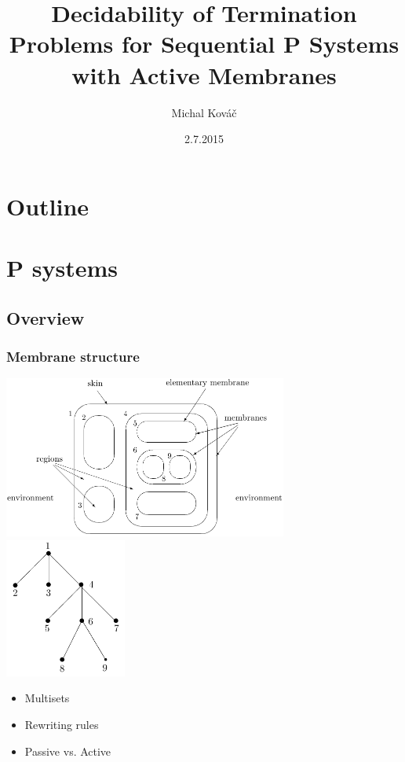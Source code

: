 \usepackage[utf8]{inputenc}
\usepackage{slovak}
\usepackage{tikz}
\usepackage{fancybox}
\usepackage[english]{babel}
\usetikzlibrary{arrows,positioning}

\title{Decidability of Termination Problems for Sequential P Systems with Active Membranes}
\author{Michal Kováč}
\date{2.7.2015}


\begin{frame}[t]
\titlepage
\end{frame}
\note{}

\section*{Outline}
\begin{frame}
\tableofcontents
\end{frame}
\note{}

\section{P systems} %
\label{sec:p_systems}

  \subsection{Overview} %
  \label{sub:overview}

    \begin{frame}[t]\frametitle{Membrane structure}
      \includegraphics[width=0.7\textwidth]{membrane_structure.png}
      \hfill
      \includegraphics[width=0.3\textwidth]{membrane_tree.png}
      \pause
      \begin{itemize}
        \item Multisets
        \pause
        \item Rewriting rules
        \pause
        \item Passive vs. Active
      \end{itemize}

    \end{frame}
    \note{}

